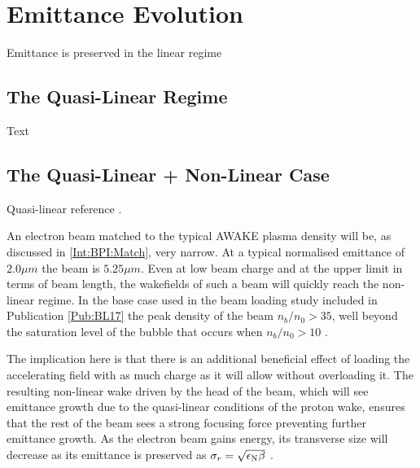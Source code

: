 \section{Emittance Evolution}
\label{Sim:Emitt}

Emittance is preserved in the linear regime

\subsection{The Quasi-Linear Regime}
\label{Sim:QLin}

Text

\subsection{The Quasi-Linear + Non-Linear Case}
\label{Sim:QLinNonLin}

Quasi-linear reference \cite{rosenzweig:2010}.

An electron beam matched to the typical AWAKE plasma density will be, as discussed in \ref{Int:BPI:Match}, very narrow. At a typical normalised emittance of $2.0\unit{\mu m}$ the beam is $5.25\unit{\mu m}$. Even at low beam charge and at the upper limit in terms of beam length, the wakefields of such a beam will quickly reach the non-linear regime. In the base case used in the beam loading study included in Publication \ref{Pub:BL17} \cite{berglyd_olsen:2018} the peak density of the beam $n_b/n_0 > 35$, well beyond the saturation level of the bubble that occurs when $n_b/n_0 > 10$ \cite{lu:2005}.

The implication here is that there is an additional beneficial effect of loading the accelerating field with as much charge as it will allow without overloading it. The resulting non-linear wake driven by the head of the beam, which will see emittance growth due to the quasi-linear conditions of the proton wake, ensures that the rest of the beam sees a strong focusing force preventing further emittance growth. As the electron beam gains energy, its transverse size will decrease as its emittance is preserved as $\sigma_{r} = \sqrt{\epsilon_{\mathrm{N}}\beta}$ \cite{wille:2001}.

